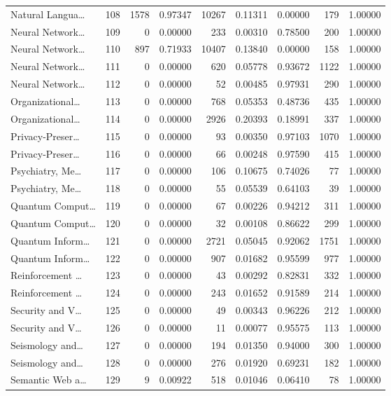 \begin{table}
\begin{tabular}{lrrrrrrrr}
Natural Langua… & 108 & 1578 & 0.97347 & 10267 & 0.11311 & 0.00000 & 179 & 1.00000 \\
Neural Network… & 109 & 0 & 0.00000 & 233 & 0.00310 & 0.78500 & 200 & 1.00000 \\
Neural Network… & 110 & 897 & 0.71933 & 10407 & 0.13840 & 0.00000 & 158 & 1.00000 \\
Neural Network… & 111 & 0 & 0.00000 & 620 & 0.05778 & 0.93672 & 1122 & 1.00000 \\
Neural Network… & 112 & 0 & 0.00000 & 52 & 0.00485 & 0.97931 & 290 & 1.00000 \\
Organizational… & 113 & 0 & 0.00000 & 768 & 0.05353 & 0.48736 & 435 & 1.00000 \\
Organizational… & 114 & 0 & 0.00000 & 2926 & 0.20393 & 0.18991 & 337 & 1.00000 \\
Privacy-Preser… & 115 & 0 & 0.00000 & 93 & 0.00350 & 0.97103 & 1070 & 1.00000 \\
Privacy-Preser… & 116 & 0 & 0.00000 & 66 & 0.00248 & 0.97590 & 415 & 1.00000 \\
Psychiatry, Me… & 117 & 0 & 0.00000 & 106 & 0.10675 & 0.74026 & 77 & 1.00000 \\
Psychiatry, Me… & 118 & 0 & 0.00000 & 55 & 0.05539 & 0.64103 & 39 & 1.00000 \\
Quantum Comput… & 119 & 0 & 0.00000 & 67 & 0.00226 & 0.94212 & 311 & 1.00000 \\
Quantum Comput… & 120 & 0 & 0.00000 & 32 & 0.00108 & 0.86622 & 299 & 1.00000 \\
Quantum Inform… & 121 & 0 & 0.00000 & 2721 & 0.05045 & 0.92062 & 1751 & 1.00000 \\
Quantum Inform… & 122 & 0 & 0.00000 & 907 & 0.01682 & 0.95599 & 977 & 1.00000 \\
Reinforcement … & 123 & 0 & 0.00000 & 43 & 0.00292 & 0.82831 & 332 & 1.00000 \\
Reinforcement … & 124 & 0 & 0.00000 & 243 & 0.01652 & 0.91589 & 214 & 1.00000 \\
Security and V… & 125 & 0 & 0.00000 & 49 & 0.00343 & 0.96226 & 212 & 1.00000 \\
Security and V… & 126 & 0 & 0.00000 & 11 & 0.00077 & 0.95575 & 113 & 1.00000 \\
Seismology and… & 127 & 0 & 0.00000 & 194 & 0.01350 & 0.94000 & 300 & 1.00000 \\
Seismology and… & 128 & 0 & 0.00000 & 276 & 0.01920 & 0.69231 & 182 & 1.00000 \\
Semantic Web a… & 129 & 9 & 0.00922 & 518 & 0.01046 & 0.06410 & 78 & 1.00000 \\

\end{tabular}
\end{table}
